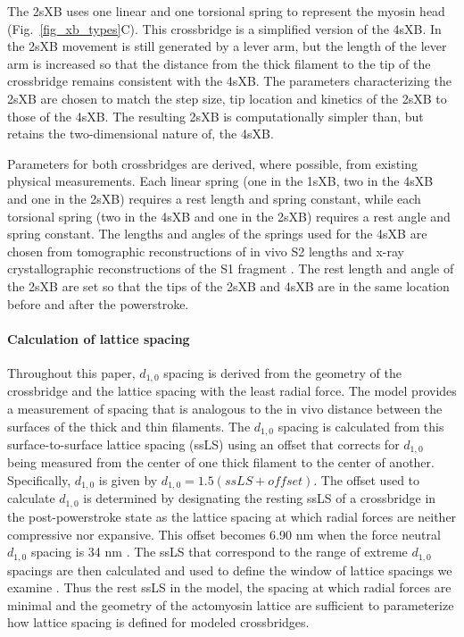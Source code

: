\documentclass[]{article}
\begin{document}
The 2sXB uses one linear and one torsional spring to represent the myosin head (Fig.~\ref{fig_xb_types}C).
This crossbridge is a simplified version of the 4sXB. 
In the 2sXB movement is still generated by a lever arm, but the length of the lever arm is increased so that the distance from the thick filament to the tip of the crossbridge remains consistent with the 4sXB.
The parameters characterizing the 2sXB are chosen to match the step size, tip location and kinetics of the 2sXB to those of the 4sXB. 
The resulting 2sXB is computationally simpler than, but retains the two-dimensional nature of, the 4sXB.

Parameters for both crossbridges are derived, where possible, from existing physical measurements.
Each linear spring (one in the 1sXB, two in the 4sXB and one in the 2sXB) requires a rest length and spring constant, while each torsional spring (two in the 4sXB and one in the 2sXB) requires a rest angle and spring constant.
The lengths and angles of the springs used for the 4sXB are chosen from tomographic reconstructions of in vivo S2 lengths and x-ray crystallographic reconstructions of the S1 fragment \citep{Taylor1999, Rayment1993}.
The rest length and angle of the 2sXB are set so that the tips of the 2sXB and 4sXB are in the same location before and after the powerstroke.



\paragraph{Calculation of lattice spacing} %
Throughout this paper, $d_{1,0}$ spacing is derived from the geometry of the crossbridge and the lattice spacing with the least radial force. 
The model provides a measurement of spacing that is analogous to the in vivo distance between the surfaces of the thick and thin filaments.
The $d_{1,0}$ spacing is calculated from this surface-to-surface lattice spacing (ssLS) using an offset that corrects for $d_{1,0}$ being measured from the center of one thick filament to the center of another. 
Specifically, $d_{1,0}$ is given by $d_{1,0} = 1.5 (ssLS + offset)$.
The offset used to calculate $d_{1,0}$ is determined by designating the resting ssLS of a crossbridge in the post-powerstroke state as the lattice spacing at which radial forces are neither compressive nor expansive.  
This offset becomes 6.90 nm when the force neutral $d_{1,0}$ spacing is 34 nm \citep{Brenner1991}. 
The ssLS that correspond to the range of extreme $d_{1,0}$ spacings are then calculated and used to define the window of lattice spacings we examine \citep{Millman1998}. %
Thus the rest ssLS in the model, the spacing at which radial forces are minimal and the geometry of the actomyosin lattice are sufficient to parameterize how lattice spacing is defined for modeled crossbridges. 
\end{document}
